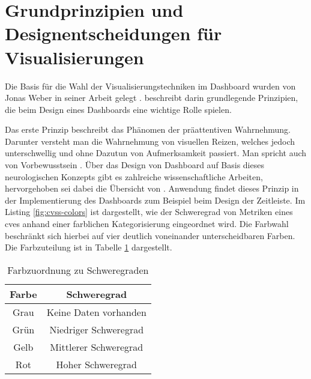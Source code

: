 \section{Grundprinzipien und Designentscheidungen für Visualisierungen}
\label{sec:auswahlDerVisualisierungstechniken}
Die Basis für die Wahl der Visualisierungstechniken im Dashboard wurden von Jonas Weber in seiner Arbeit gelegt \autocite{weberEvaluationDashboardTechniques}. \citeauthor{weberEvaluationDashboardTechniques} beschreibt darin grundlegende Prinzipien, die beim Design eines Dashboards eine wichtige Rolle spielen.
\par Das erste Prinzip beschreibt das Phänomen der präattentiven Wahrnehmung. Darunter versteht man die Wahrnehmung von visuellen Reizen, welches jedoch unterschwellig und ohne Dazutun von Aufmerksamkeit passiert. Man spricht auch von Vorbewusstsein \autocite{PraeattentiveWahrnehmung,mallotWahrnehmungPraeattentiveIm2021}. Über das Design von Dashboard auf Basis dieses neurologischen Konzepts gibt es zahlreiche wissenschaftliche Arbeiten, hervorgehoben sei dabei die Übersicht von \citeauthor{barrera-leonHowPreattentiveProcess2023} \autocite{barrera-leonHowPreattentiveProcess2023}. Anwendung findet dieses Prinzip in der Implementierung des Dashboards zum Beispiel beim Design der Zeitleiste. Im Listing \ref{fig:cvss-colors} ist dargestellt, wie der Schweregrad von Metriken eines \glspl{cve} anhand einer farblichen Kategorisierung eingeordnet wird. Die Farbwahl beschränkt sich hierbei auf vier deutlich voneinander unterscheidbaren Farben. Die Farbzuteilung ist in Tabelle \ref{tab:severity-color-mapping} dargestellt.
\begin{table}[H]
    \centering
    \caption{Farbzuordnung zu Schweregraden}
    \begin{tabular}{|c|c|}
        \hline
        \textbf{Farbe}                & \textbf{Schweregrad}  \\
        \hline
        \cellcolor[HTML]{6c757d} Grau & Keine Daten vorhanden \\
        \hline
        \cellcolor[HTML]{198754} Grün & Niedriger Schweregrad \\
        \hline
        \cellcolor[HTML]{ffc107} Gelb & Mittlerer Schweregrad \\
        \hline
        \cellcolor[HTML]{dc3545} Rot  & Hoher Schweregrad     \\
        \hline
    \end{tabular}
    \label{tab:severity-color-mapping}
\end{table}

